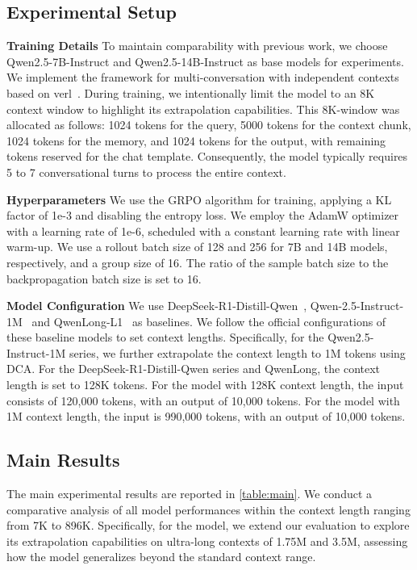 \subsection{Experimental Setup}

\textbf{Training Details} To maintain comparability with previous work, we choose Qwen2.5-7B-Instruct and Qwen2.5-14B-Instruct as  base models for experiments. We implement the framework for multi-conversation with independent contexts based on verl~\cite{sheng2024hybridflow}. During training, we intentionally limit the model to an 8K context window to highlight its extrapolation capabilities. This 8K-window was allocated as follows: 1024 tokens for the query, 5000 tokens for the context chunk, 1024 tokens for the memory, and 1024 tokens for the output, with remaining tokens reserved for the chat template. Consequently, the model typically requires 5 to 7 conversational turns to process the entire context.

\textbf{Hyperparameters} We use the GRPO algorithm for training, applying a KL factor of 1e-3 and disabling the entropy loss. We employ the AdamW optimizer with a learning rate of 1e-6, scheduled with a constant learning rate with linear warm-up. We use a rollout batch size of 128 and 256 for 7B and 14B models, respectively, and a group size of 16. The ratio of the sample batch size to the backpropagation batch size is set to 16.

\textbf{Model Configuration} We use DeepSeek-R1-Distill-Qwen~\cite{guo2025deepseek}, Qwen-2.5-Instruct-1M~\cite{qwen2.5-1m} and QwenLong-L1~\cite{wan2025qwenlong} as baselines. We follow the official configurations of these baseline models to set context lengths. Specifically, for the Qwen2.5-Instruct-1M series, we further extrapolate the context length to 1M tokens using DCA. For the DeepSeek-R1-Distill-Qwen series and QwenLong, the context length is set to 128K tokens. For the model with 128K context length, the input consists of 120,000 tokens, with an output of 10,000 tokens. For the model with 1M context length, the input is 990,000 tokens, with an output of 10,000 tokens.


\subsection{Main Results}

The main experimental results are reported in \autoref{table:main}. We conduct a comparative analysis of all model performances within the context length ranging from 7K to 896K. Specifically, for the \method model, we extend our evaluation to explore its extrapolation capabilities on ultra-long contexts of 1.75M and 3.5M, assessing how the model generalizes beyond the standard context range.

